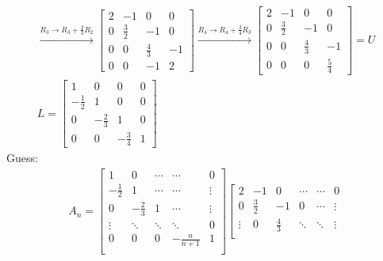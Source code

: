 \documentclass[a4paper,12pt]{article}
\begin{document}
\begin{enumerate}
\begin{gather*}
            \xrightarrow{R_3 \rightarrow R_3 + \frac{2}{3}R_2}
            \left[ \begin{array}{cccc}
                2 &-1 &0 &0 \\
                0 &\frac{3}{2} &-1 &0 \\
                0 &0 &\frac{4}{3} &-1 \\
                0 &0 &-1 &2
            \end{array} \right]
            \xrightarrow{R_4 \rightarrow R_4 + \frac{3}{4}R_3}
            \left[ \begin{array}{cccc}
                2 &-1 &0 &0 \\
                0 &\frac{3}{2} &-1 &0 \\
                0 &0 &\frac{4}{3} &-1 \\
                0 &0 &0 &\frac{5}{4}
            \end{array} \right] = U \\
            L = \left[ \begin{array}{cccc}
                    1 & 0 & 0 & 0 \\
                    -\frac{1}{2} & 1 & 0 & 0 \\
                    0 & -\frac{2}{3} & 1 & 0 \\
                    0 & 0 & -\frac{3}{4} & 1
            \end{array} \right]
        \end{gather*}
        Guess:
        \begin{gather*}
            A_n =
            \left[ \begin{array}{ccccc}
                    1 & 0 & \cdots & \cdots & 0 \\
                    -\frac{1}{2} & 1 & \cdots & \cdots & \vdots \\
                    0 & -\frac{2}{3} & 1 & \cdots & \vdots \\
                    \vdots & \ddots & \ddots & \ddots & 0 \\
                    0 & 0 & 0 & -\frac{n}{n + 1} & 1 \\
            \end{array} \right]
            \left[ \begin{array}{cccccc}
                    2 & -1 & 0 & \cdots & \cdots & 0 \\
                    0 & \frac{3}{2} & -1 & 0 & \cdots & \vdots \\
                    \vdots & 0 & \frac{4}{3} & \ddots & \ddots & \vdots \\

\end{array}
\end{gather*}
\end{enumerate}
\end{document}
